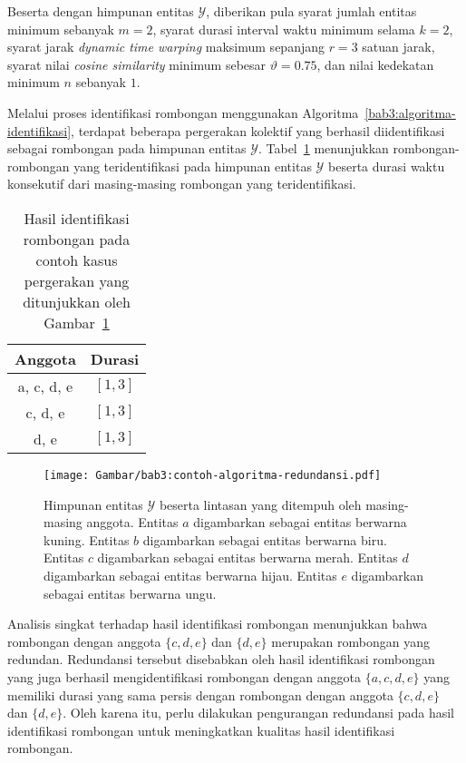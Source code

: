 Beserta dengan himpunan entitas $\mathcal{Y}$, diberikan pula syarat jumlah entitas minimum sebanyak $m = 2$, syarat durasi interval waktu minimum selama $k = 2$, syarat jarak \textit{dynamic time warping} maksimum sepanjang $r = 3$ satuan jarak, syarat nilai \textit{cosine similarity} minimum sebesar $\vartheta = 0.75$, dan nilai kedekatan minimum $n$ sebanyak $1$.

Melalui proses identifikasi rombongan menggunakan Algoritma~\ref{bab3:algoritma-identifikasi}, terdapat beberapa pergerakan kolektif yang berhasil diidentifikasi sebagai rombongan pada himpunan entitas $\mathcal{Y}$. Tabel~\ref{bab6:contoh-identifikasi-redundan} menunjukkan rombongan-rombongan yang teridentifikasi pada himpunan entitas $\mathcal{Y}$ beserta durasi waktu konsekutif dari masing-masing rombongan yang teridentifikasi.

\begin{table}[h]
    \centering
    \captionsetup{width=0.6\textwidth}
    \caption{Hasil identifikasi rombongan pada contoh kasus pergerakan yang ditunjukkan oleh Gambar~\ref{bab3:contoh-algoritma-redundansi}}
    \begin{tabular}{|c|c|}
        \hline
        Anggota & Durasi \\
        \hline
        a, c, d, e & $[1, 3]$ \\
        c, d, e & $[1, 3]$ \\
        d, e & $[1, 3]$ \\
        \hline
    \end{tabular}
    \label{bab6:contoh-identifikasi-redundan}
\end{table}

\begin{figure}[t]
    \centering
    \captionsetup{width=0.8\textwidth}
    \texttt{[image: Gambar/bab3:contoh-algoritma-redundansi.pdf]}
    \caption[Contoh proses algoritma pengurangan redundansi]{Himpunan entitas $\mathcal{Y}$ beserta lintasan yang ditempuh oleh masing-masing anggota. Entitas $a$ digambarkan sebagai entitas berwarna kuning. Entitas $b$ digambarkan sebagai entitas berwarna biru. Entitas $c$ digambarkan sebagai entitas berwarna merah. Entitas $d$ digambarkan sebagai entitas berwarna hijau. Entitas $e$ digambarkan sebagai entitas berwarna ungu.}
    \label{bab3:contoh-algoritma-redundansi}
\end{figure}

Analisis singkat terhadap hasil identifikasi rombongan menunjukkan bahwa rombongan dengan anggota $\{ c, d, e \}$ dan $\{ d, e \}$ merupakan rombongan yang redundan. Redundansi tersebut disebabkan oleh hasil identifikasi rombongan yang juga berhasil mengidentifikasi rombongan dengan anggota $\{ a, c, d, e \}$ yang memiliki durasi yang sama persis dengan rombongan dengan anggota $\{ c, d, e \}$ dan $\{ d, e \}$. Oleh karena itu, perlu dilakukan pengurangan redundansi pada hasil identifikasi rombongan untuk meningkatkan kualitas hasil identifikasi rombongan.

